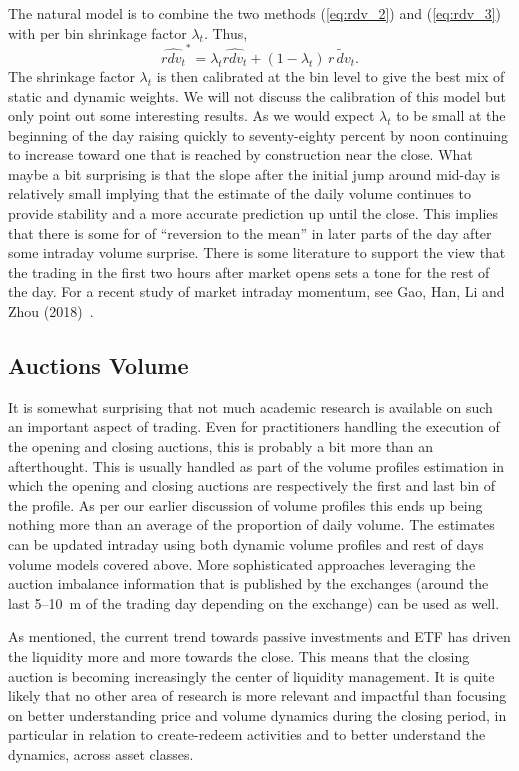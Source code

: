The natural  model is to combine the two methods (\ref{eq:rdv_2}) and (\ref{eq:rdv_3}) with per bin shrinkage factor $\lambda_t$. Thus,
	\begin{equation}\label{eq:rdv_4}
	\widehat{rdv_t}^* = \lambda_t \widehat{rdv_t} + (1-\lambda_t)\, \widetilde{r\, dv_t}.
	\end{equation}
The shrinkage factor $\lambda_t$ is then calibrated at the bin level to give the best mix of static and dynamic weights. We will not discuss the calibration of this model but only point out some interesting results. As we would expect $\lambda_t$ to be small at the beginning of the day raising quickly to seventy-eighty percent by noon continuing to increase toward one that is reached by construction near the close. What maybe a bit surprising is that the slope after the initial jump around mid-day is relatively small implying that the estimate of the daily volume continues to provide stability and a more accurate prediction up until the close. This implies that there is some for of ``reversion to the mean'' in later parts of the day after some intraday volume surprise. There is some literature to support the view that the trading in the first two hours after market opens sets a tone for the rest of the day. For a recent study of market intraday momentum, see Gao, Han, Li and Zhou (2018)~\cite{ghliz}.


\subsection{Auctions Volume}

It is somewhat surprising that not much academic research is available on such an important aspect of trading. Even for practitioners handling the execution of the opening and closing auctions, this is probably a bit more than an afterthought. This is usually handled as part of the volume profiles estimation in which the opening and closing auctions are respectively the first and last bin of the profile. As per our earlier discussion of volume profiles this ends up being nothing more than an average of the proportion of daily volume. The estimates can be updated  intraday using both dynamic volume profiles and rest of days volume models covered above. More sophisticated approaches leveraging the auction imbalance information that is published by the exchanges (around the last 5--10~m of the trading day depending on the exchange) can be used as well.


As mentioned, the current trend towards passive investments and ETF has driven the liquidity more and more towards the close. This means that the closing auction is becoming increasingly the center of liquidity management.  It is quite likely that no other area of research is more relevant and impactful than focusing on better understanding price and volume dynamics during the closing period, in particular in relation to create-redeem activities and to better understand the dynamics, across asset classes.



